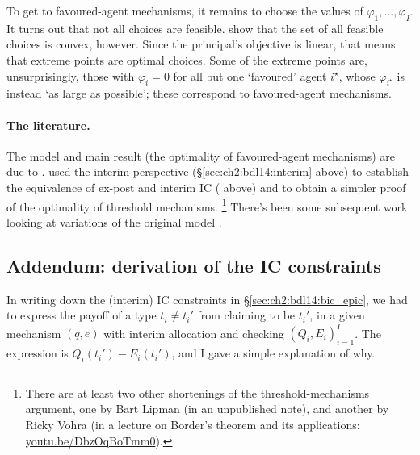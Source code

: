 To get to favoured-agent mechanisms, it remains to choose the values of $\varphi_1,\dots,\varphi_I$. It turns out that not all choices are feasible.
\textcite{BenporathDekelLipman2014} show that the set of all feasible choices is convex, however.
Since the principal's objective is linear, that means that extreme points are optimal choices.
Some of the extreme points are, unsurprisingly, those with $\varphi_i=0$ for all but one `favoured' agent $i^\star$, whose $\varphi_{i^\star}$ is instead `as large as possible';
these correspond to favoured-agent mechanisms.


\paragraph{The literature.}
The model and main result (the optimality of favoured-agent mechanisms) are due to \textcite{BenporathDekelLipman2014}.
\textcite{ErlansonKleiner2019} used the interim perspective (§\ref{sec:ch2:bdl14:interim} above)
to establish the equivalence of ex-post and interim IC ( above)
and to obtain a simpler proof of the optimality of threshold mechanisms.%
	\footnote{There are at least two other shortenings of the threshold-mechanisms argument, one by Bart Lipman (in an unpublished note), and another by Ricky Vohra (in a lecture on Border's theorem and its applications: \href{https://youtu.be/DbzOqBoTmm0}{youtu.be/DbzOqBoTmm0}).}
There's been some subsequent work looking at variations of the original model \parencite[e.g.][]{KattwinkelKnoepfle2022,ErlansonKleiner2020,ErlansonKleiner2022}.



\subsection*{Addendum: derivation of the IC constraints}
\label{sec:ch2:bdl14:ic_deriv}

In writing down the (interim) IC constraints in §\ref{sec:ch2:bdl14:bic_epic},
we had to express the payoff of a type $t_i \neq t_i'$ from claiming to be $t_i'$, in a given mechanism $(q,e)$ with interim allocation and checking $(Q_i,E_i)_{i=1}^I$.
The expression is $Q_i(t_i') - E_i(t_i')$, and I gave a simple explanation of why.

